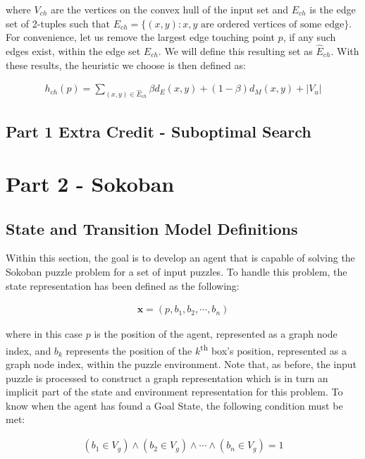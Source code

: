 \documentclass{article}[12pt]
\begin{document}
where $V_{ch}$ are the vertices on the convex hull of the input set and $E_{ch}$ is the edge set of 2-tuples such that $E_{ch} = \lbrace (x,y): x,y \text{ are ordered vertices of some edge} \rbrace$. For convenience, let us remove the largest edge touching point $p$, if any such edges exist, within the edge set $E_{ch}$. We will define this resulting set as $\hat{E}_{ch}$. With these results, the heuristic we choose is then defined as:

\begin{align*}
h_{ch}(p) = \sum_{(x,y) \in \hat{E}_{ch}} \beta d_{E}(x,y) + \left(1-\beta\right) d_{M}(x,y) + |V_u|
\end{align*}
   
   \newpage
   \subsection{Part 1 Extra Credit - Suboptimal Search}
   
   \newpage
   \section{Part 2 - Sokoban}
   \subsection{State and Transition Model Definitions}
   Within this section, the goal is to develop an agent that is capable of solving the Sokoban puzzle problem for a set of input puzzles. To handle this problem, the state representation has been defined as the following:
   
   \begin{align*}
   \boldsymbol{x} = \left( p, b_1, b_2, \cdots, b_n \right)
   \end{align*}
   
   where in this case $p$ is the position of the agent, represented as a graph node index, and $b_k$ represents the position of the $k$\textsuperscript{th} box's position, represented as a graph node index, within the puzzle environment. Note that, as before, the input puzzle is processed to construct a graph representation which is in turn an implicit part of the state and environment representation for this problem. To know when the agent has found a Goal State, the following condition must be met:
   
   \begin{align*}
   \left(b_1 \in V_g \right) \wedge \left(b_2 \in V_g \right) \wedge \cdots \wedge \left(b_n \in V_g \right) = 1
   \end{align*}
   
\end{document}
